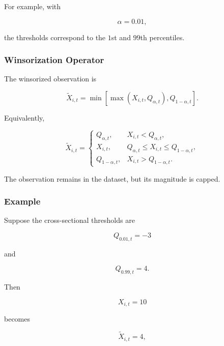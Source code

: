 \documentclass[11pt,a4paper]{article}
\begin{document}
For example, with

\begin{equation}
\alpha=0.01,
\end{equation}

the thresholds correspond to the $1$st and $99$th percentiles.


\subsubsection{Winsorization Operator}

The winsorized observation is

\begin{equation}
\boxed{
\widetilde{X}_{i,t}
=
\min
\left[
\max
\left(
X_{i,t},
Q_{\alpha,t}
\right),
Q_{1-\alpha,t}
\right].
}
\end{equation}

Equivalently,

\begin{equation}
\widetilde{X}_{i,t}
=
\begin{cases}
Q_{\alpha,t},
&
X_{i,t}
<
Q_{\alpha,t},
\\[0.15cm]
X_{i,t},
&
Q_{\alpha,t}
\leq
X_{i,t}
\leq
Q_{1-\alpha,t},
\\[0.15cm]
Q_{1-\alpha,t},
&
X_{i,t}
>
Q_{1-\alpha,t}.
\end{cases}
\end{equation}

The observation remains in the dataset, but its magnitude is capped.


\subsubsection{Example}

Suppose the cross-sectional thresholds are

\begin{equation}
Q_{0.01,t}
=
-3
\end{equation}

and

\begin{equation}
Q_{0.99,t}
=
4.
\end{equation}

Then

\begin{equation}
X_{i,t}=10
\end{equation}

becomes

\begin{equation}
\widetilde{X}_{i,t}=4,
\end{equation}
\end{document}
